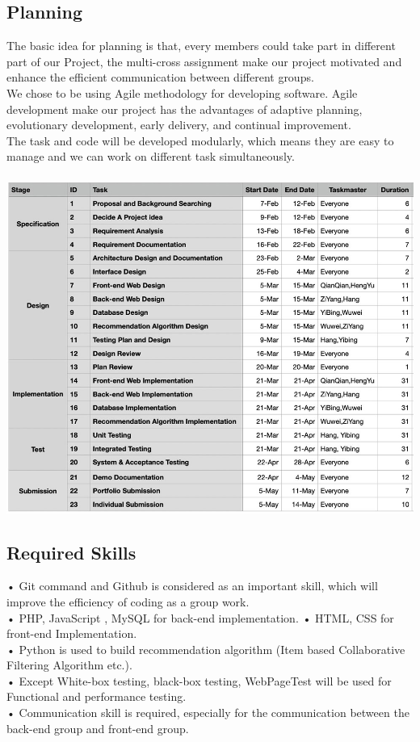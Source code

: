 \documentclass[12pt]{article}
\begin{document}
\subsection{Planning}
The basic idea for planning is that, every members could take part in different part of our Project,  the  multi-cross assignment make our project motivated and enhance the efficient communication between different groups.\\
We chose to be using Agile methodology for developing software. Agile development make our project has the advantages of adaptive planning, evolutionary development, early delivery, and continual improvement. \\
The task and code will be developed modularly, which means they are easy to manage and we can work on different task simultaneously.\\\\
\includegraphics[width=1\linewidth]{PD.jpg}
\newpage
\subsection{Required Skills}
•	Git command and Github is considered as an important skill, which will improve the efficiency of coding as a group work. \\
•	PHP, JavaScript , MySQL for back-end implementation.
•	HTML, CSS for front-end Implementation.\\
•	Python is used to build recommendation algorithm (Item based Collaborative Filtering Algorithm etc.). \\
•	Except  White-box testing, black-box testing, WebPageTest will be used for Functional and performance testing.\\ 
•	Communication skill is required, especially for the communication between the back-end group and front-end group. \\
\end{document}
